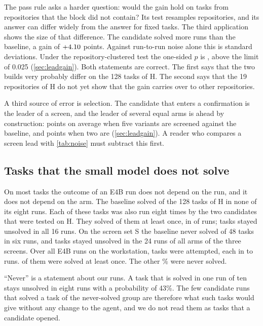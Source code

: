 The pass rule asks a harder question: would the gain hold on tasks from repositories that the block did not contain?
Its test resamples repositories, and its answer can differ widely from the answer for fixed tasks. The third
application shows the size of that difference. The candidate solved \CandThreeDiffRuns{} more runs than the baseline,
a gain of $+4.10$ points. Against run-to-run noise alone this is \CandThreeNoiseRatio{} standard deviations.
Under the repository-clustered test the one-sided $p$ is \GatePThree{}, above the limit of 0.025
(\cref{sec:leadgain}). Both statements are correct. The first says that the two builds very probably differ on the
128 tasks of H. The second says that the 19 repositories of H do not yet show that the gain carries over to other
repositories.

A third source of error is selection. The candidate that enters a confirmation is the leader of a screen, and the
leader of several equal arms is ahead by construction: \ScreenNullLeadFive{} points on average when five variants are
screened against the baseline, and \ScreenNullLeadTwo{} points when two are (\cref{sec:leadgain}). A reader who compares a screen
lead with \cref{tab:noise} must subtract this first.

\subsection{Tasks that the small model does not solve}\label{sec:never}

On most tasks the outcome of an E4B run does not depend on the run, and it does not depend on the arm. The baseline
solved \HNever{} of the 128 tasks of H in none of its eight runs. Each of these tasks was also run eight times by the
two candidates that were tested on H. They solved \HNeverRescued{} of them at least once, in \HNeverRescuedRuns{} of \HNeverCandRuns{}
runs; \HNeverAny{} tasks stayed unsolved in all 16 runs. On the screen set S the baseline never solved \SNeverBase{}
of 48 tasks in six runs, and \SNeverAny{} tasks stayed unsolved in the 24 runs of all arms of the three screens. Over
all E4B runs on the workstation, \WsTasksAny{} tasks were attempted, each in \WsRunsPerTaskMin{} to
\WsRunsPerTaskMax{} runs. \WsTasksSolvedAny{} of them were solved at least once. The other
\WsTasksNeverPct\% were never solved.

``Never'' is a statement about our runs. A task that is solved in one run of ten stays unsolved in eight runs with a
probability of 43\%. The few candidate runs that solved a task of the never-solved group are therefore what such tasks
would give without any change to the agent, and we do not read them as tasks that a candidate opened.

